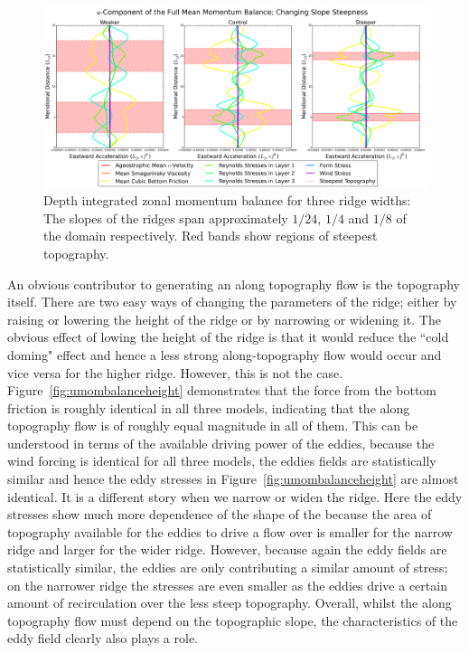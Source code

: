 \documentclass[12pt,a4paper]{report}
\newcommand*\figref[1]{Figure~\ref{#1}}
\begin{document}
  \begin{figure}
  	\centering
  	\includegraphics[width=\linewidth]{umom_3_4}
  	\caption{ Depth integrated zonal momentum balance for three ridge widths: 
  		The slopes of the ridges span approximately $1/24$, $1/4$ and $1/8$
  		of the domain respectively. Red bands show regions of steepest topography.}
  	\label{fig:umombalancewidth}
  \end{figure}
    
  An obvious contributor to generating an along topography flow is the topography
  itself. There are two easy ways of changing the parameters of the ridge; either
  by raising or lowering the height of the ridge or by narrowing or widening it. 
  The obvious effect of lowing the height of the ridge is that it would reduce the 
  ``cold doming" effect and hence a less strong along-topography flow would occur
  and vice versa for the higher ridge. 
  However, this is not the case. \figref{fig:umombalanceheight} demonstrates that
  the force from the bottom friction is roughly identical in all three models, 
  indicating that the along topography flow is of roughly equal magnitude in all of them.
  This can be understood in terms of the available driving power of the eddies,
  because the wind forcing is identical for all three models, the eddies fields
  are statistically similar and hence the eddy stresses in \figref{fig:umombalanceheight}
  are almost identical. It is a different story when we narrow or widen the ridge.
  Here the eddy stresses show much more dependence of the shape of the because
  the area of topography available for the eddies to drive a flow over is smaller 
  for the narrow ridge and larger for the wider ridge. However, because again the
  eddy fields are statistically similar, the eddies are only contributing 
  a similar amount of stress; on the narrower ridge the stresses are even smaller
  as the eddies drive a certain amount of recirculation over the less steep topography.
  Overall, whilst the along topography flow must depend on the topographic slope,
  the characteristics of the eddy field clearly also plays a role.
  
\end{document}
